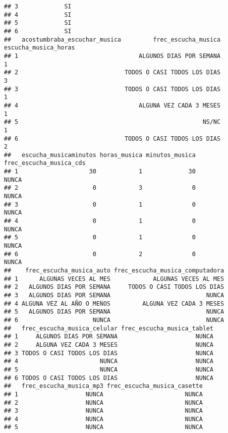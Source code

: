 \documentclass[
]{article}
\begin{document}
\begin{verbatim}
## 3             SI                                                       
## 4             SI                                                       
## 5             SI                                                       
## 6             SI                                                       
##   acostumbraba_escuchar_musica         frec_escucha_musica escucha_musica_horas
## 1                                  ALGUNOS DIAS POR SEMANA                    1
## 2                              TODOS O CASI TODOS LOS DIAS                    3
## 3                              TODOS O CASI TODOS LOS DIAS                    1
## 4                                  ALGUNA VEZ CADA 3 MESES                    1
## 5                                                    NS/NC                    1
## 6                              TODOS O CASI TODOS LOS DIAS                    2
##   escucha_musicaminutos horas_musica minutos_musica frec_escucha_musica_cds
## 1                    30            1             30                   NUNCA
## 2                     0            3              0                   NUNCA
## 3                     0            1              0                   NUNCA
## 4                     0            1              0                   NUNCA
## 5                     0            1              0                   NUNCA
## 6                     0            2              0                   NUNCA
##    frec_escucha_musica_auto frec_escucha_musica_computadora
## 1      ALGUNAS VECES AL MES            ALGUNAS VECES AL MES
## 2   ALGUNOS DIAS POR SEMANA     TODOS O CASI TODOS LOS DIAS
## 3   ALGUNOS DIAS POR SEMANA                           NUNCA
## 4 ALGUNA VEZ AL AÑO O MENOS         ALGUNA VEZ CADA 3 MESES
## 5   ALGUNOS DIAS POR SEMANA                           NUNCA
## 6                     NUNCA                           NUNCA
##   frec_escucha_musica_celular frec_escucha_musica_tablet
## 1     ALGUNOS DIAS POR SEMANA                      NUNCA
## 2     ALGUNA VEZ CADA 3 MESES                      NUNCA
## 3 TODOS O CASI TODOS LOS DIAS                      NUNCA
## 4                       NUNCA                      NUNCA
## 5                       NUNCA                      NUNCA
## 6 TODOS O CASI TODOS LOS DIAS                      NUNCA
##   frec_escucha_musica_mp3 frec_escucha_musica_casette
## 1                   NUNCA                       NUNCA
## 2                   NUNCA                       NUNCA
## 3                   NUNCA                       NUNCA
## 4                   NUNCA                       NUNCA
## 5                   NUNCA                       NUNCA

\end{verbatim}
\end{document}
